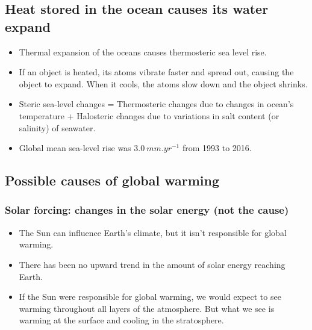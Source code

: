 \documentclass[11pt]{article}
\begin{document}
\newpage

\subsection{Heat stored in the ocean causes its water expand}
\label{sec:org66d4f2d}
\begin{itemize}
\item Thermal expansion of the oceans causes thermosteric sea level rise.
\item If an object is heated, its atoms vibrate faster and spread out, causing the object to expand. When it cools, the atoms slow down and the object shrinks.
\item Steric sea-level changes = Thermosteric changes due to changes in ocean's temperature + Halosteric changes due to variations in salt content (or salinity) of seawater.
\item Global mean sea-level rise was \(\qty{3.0}{mm.yr^{-1}}\) from 1993 to 2016.
\end{itemize}

\subsection{Possible causes of global warming}
\label{sec:orge4cefea}

\subsubsection{Solar forcing: changes in the solar energy (not the cause)}
\label{sec:org2d9e0fa}
\begin{itemize}
\item The Sun can influence Earth's climate, but it isn't responsible for global warming.
\item There has been no upward trend in the amount of solar energy reaching Earth.
\item If the Sun were responsible for global warming, we would expect to see warming throughout all layers of the atmosphere. But what we see is warming at the surface and cooling in the stratosphere.
\end{itemize}
\end{document}
